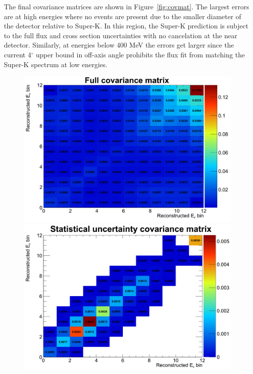 The final covariance matrices are shown in Figure~\ref{fig:covmat}. The largest errors are at high energies where no \nuprismlite events are present due to the smaller diameter of the detector relative to Super-K. In this region, the Super-K prediction is subject to the full flux and cross section uncertainties with no cancelation at the near detector. Similarly, at energies below 400 MeV the errors get larger since the current 4$^\circ$ upper bound in off-axis angle prohibits the \nuprismlite flux fit from matching the Super-K spectrum at low energies.

\begin{figure}[htpb]
\begin{center}
  \begin{minipage}[t]{.45\textwidth}
    \begin{center}
      \includegraphics[width=\textwidth] {figures/FullCov.png}
    \end{center}
  \end{minipage}
  \begin{minipage}[t]{.45\textwidth}
    \begin{center}
      \includegraphics[width=\textwidth] {figures/StatsCov.png}

\end{center}
\end{minipage}
\end{center}
\end{figure}
